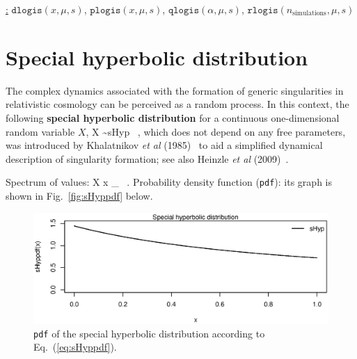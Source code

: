 \medskip
\noindent
\underline{\R:} $\texttt{dlogis}(x,\mu,s)$,
$\texttt{plogis}(x,\mu,s)$, $\texttt{qlogis}(\alpha,\mu,s)$,
$\texttt{rlogis}(n_{\mathrm{simulations}},\mu,s)$

\section[Special hyperbolic distribution]{Special hyperbolic
distribution}
The complex dynamics associated with the formation of generic 
singularities in relativistic cosmology can be perceived as a 
random process. In this context, the following \textbf{special 
hyperbolic distribution} for a continuous one-dimensional random 
variable $X$,
%
\be
X \sim sHyp \ ,
\ee
%
which does not depend on any free parameters, was introduced by 
Khalatnikov {\em et al\/} (1985)~ to aid a 
simplified dynamical description of singularity formation; see 
also Heinzle {\em et al\/} (2009)~.

\medskip
\noindent
Spectrum of values:
%
\be
X \mapsto x \in \left[0,1\right]
\subset {}_{} \ .
\ee
%
Probability density function (\texttt{pdf}):
%
\be
{}
\ee
%
its graph is shown in Fig.~\ref{fig:sHyppdf} below.
%
\begin{figure}[!htb]
\begin{center}
\includegraphics[scale=0.8]{sHyppdf.eps}
\end{center}
\caption{\texttt{pdf} of the special hyperbolic distribution 
according to Eq.~(\ref{eq:sHyppdf}).}
\end{figure}
%


